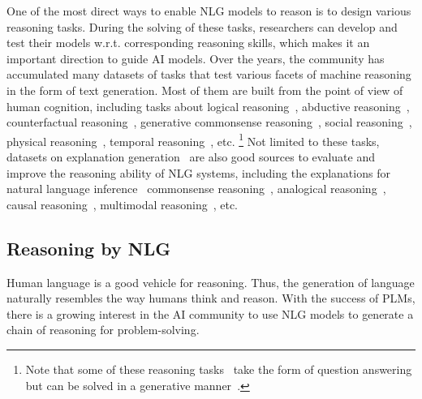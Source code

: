 One of the most direct ways to enable NLG models to reason is to design various reasoning tasks.
During the solving of these tasks, researchers can develop and test their models w.r.t. corresponding reasoning skills, which makes it an important direction to guide AI models.
Over the years, the community has accumulated many datasets of tasks that test various facets of machine reasoning in the form of text generation.
Most of them are built from the point of view of human cognition, including tasks about logical reasoning~\cite{dalvi-etal-2021-explaining}, abductive reasoning~\cite{bhagavatula2020abductive}, counterfactual reasoning~\cite{qin-etal-2019-counterfactual}, generative commonsense reasoning~\cite{lin-etal-2020-commongen}, social reasoning~\cite{sap-etal-2019-social}, physical reasoning~\cite{Bisk_Zellers_Le_bras_Gao_Choi_2020}, temporal reasoning~\cite{zhou-etal-2019-going}, etc. \footnote{Note that some of these reasoning tasks~\cite{sap-etal-2019-social,Bisk_Zellers_Le_bras_Gao_Choi_2020,zhou-etal-2019-going} take the form of question answering but can be solved in a generative manner~\cite{2020unifiedqa}.}
Not limited to these tasks, datasets on explanation generation~\cite{wiegreffe-marasovic-2021-review} are also good sources to evaluate and improve the reasoning ability of NLG systems, including the explanations for natural language inference~\cite{NEURIPS2018_4c7a167b} commonsense reasoning~\cite{rajani-etal-2019-explain}, analogical reasoning~\cite{chen-etal-2022-e}, causal reasoning~\cite{du-etal-2022-e}, multimodal reasoning~\cite{li2018vqae}, etc.







\subsection{Reasoning by NLG}
\label{subsec:reasoning-by-nlg}

Human language is a good vehicle for reasoning.
Thus, the generation of language naturally resembles the way humans think and reason.
With the success of PLMs, there is a growing interest in the AI community to use NLG models to generate a chain of reasoning for problem-solving.


